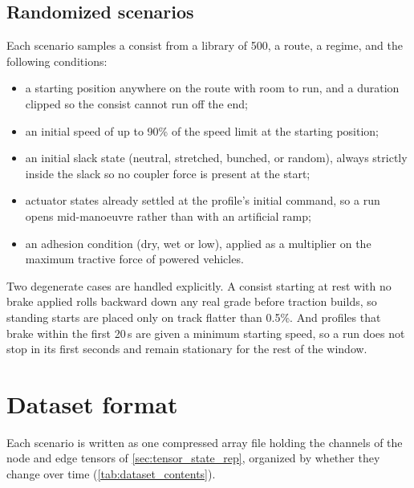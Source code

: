 \subsection{Randomized scenarios}

Each scenario samples a consist from a library of 500, a route, a regime, and the following conditions:

\begin{itemize}
    \item a starting position anywhere on the route with room to run, and a duration clipped so the consist cannot run off the end;
    \item an initial speed of up to 90\% of the speed limit at the starting position;
    \item an initial slack state (neutral, stretched, bunched, or random), always strictly inside the slack so no coupler force is present at the start;
    \item actuator states already settled at the profile's initial command, so a run opens mid-manoeuvre rather than with an artificial ramp;
    \item an adhesion condition (dry, wet or low), applied as a multiplier on the maximum tractive force of powered vehicles.
\end{itemize}

Two degenerate cases are handled explicitly. A consist starting at rest with no brake applied rolls backward down any real grade before traction builds, so standing starts are placed only on track flatter than 0.5\%. And profiles that brake within the first 20\,s are given a minimum starting speed, so a run does not stop in its first seconds and remain stationary for the rest of the window.

\section{Dataset format}
\label{sec:dataset_format}

Each scenario is written as one compressed array file holding the channels of the node and edge tensors of \cref{sec:tensor_state_rep}, organized by whether they change over time (\cref{tab:dataset_contents}).

